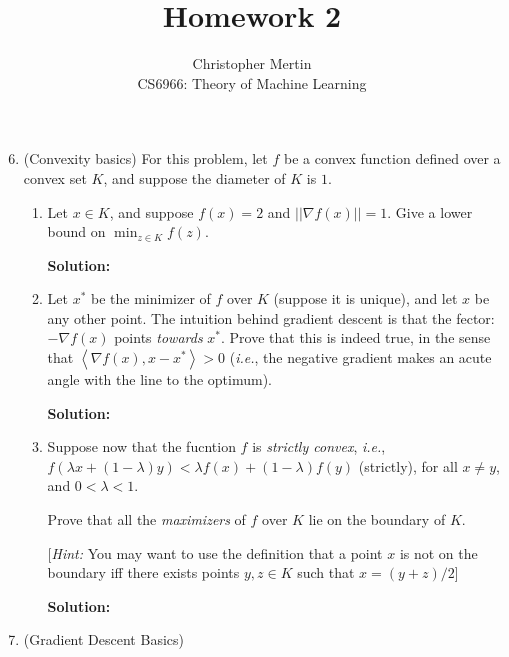 \documentclass[12pt]{article}
\newcommand{\norm}[1]{\left|\left| #1 \right|\right|}
\newcommand{\inner}[2]{\left< #1 , #2\right>}
\begin{document}
 
 
\title{Homework 2}%
\author{Christopher Mertin\\ %
CS6966: Theory of Machine Learning} %
 
\maketitle

\begin{enumerate}
  \setcounter{enumi}{5}
\item (Convexity basics) For this problem, let $f$ be a convex function defined over a convex set $K$, and suppose the diameter of $K$ is $1$.
  \begin{enumerate}
    \item Let $x \in K$, and suppose $f(x) = 2$ and $\norm{\nabla f(x)} = 1$. Give a lower bound on $\min_{z\in K}f(z)$.

      {\bf Solution:}
      
    \item Let $x^{*}$ be the minimizer of $f$ over $K$ (suppose it is unique), and let $x$ be any other point. The intuition behind gradient descent is that the fector: $-\nabla f(x)$ points {\em towards} $x^{*}$. Prove that this is indeed true, in the sense that $\inner{\nabla f(x)}{x - x^{*}} > 0$ ({\em i.e.}, the negative gradient makes an acute angle with the line to the optimum).

      {\bf Solution:}


    \item Suppose now that the fucntion $f$ is {\em strictly convex}, {\em i.e.}, $f(\lambda x + (1 - \lambda)y) < \lambda f(x) + (1 - \lambda) f(y)$ (strictly), for all $x \neq y$, and $0 < \lambda < 1$. 

Prove that all the {\em maximizers} of $f$ over $K$ lie on the boundary of $K$. 

[{\em Hint:} You may want to use the definition that a point $x$ is not on the boundary iff there exists points $y,z \in K$ such that $x = (y+z)/2$]

      {\bf Solution:}
  \end{enumerate}

\item (Gradient Descent Basics)


\end{enumerate}
\end{document}
